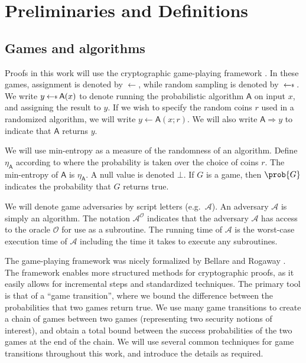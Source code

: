 \chapter{Preliminaries and Definitions} \label{sec:preliminaries}

\section{Games and algorithms}
Proofs in this work will use the cryptographic game-playing framework \cite{EC:BelRog06}. In these games, assignment is denoted by $\leftarrow$, while random sampling is denoted by $\sample$. We write $y \sample \mathsf{A}(x)$ to denote running the probabilistic algorithm $\mathsf{A}$ on input $x$, and assigning the result to $y$. If we wish to specify the random coins $r$ used in a randomized algorithm, we will write $y \leftarrow \mathsf{A}(x;r)$. We will also write $\mathsf{A} \Rightarrow y$ to indicate that $\mathsf{A}$ returns $y$.

We will use min-entropy as a measure of the randomness of an algorithm. Define $\eta_\mathsf{A}$ according to
where the probability is taken over the choice of coins $r$. The min-entropy of $\mathsf{A}$ is $\eta_\mathsf{A}$. A null value is denoted $\bot$. If $G$ is a game, then $\prob{G}$ indicates the probability that $G$ returns true. 

We will denote game adversaries by script letters (e.g.\ $\mathcal{A}$). An adversary $\mathcal{A}$ is simply an algorithm. The notation $\mathcal{A}^{\mathcal{O}}$ indicates that the adversary $\mathcal{A}$ has access to the oracle $\mathcal{O}$ for use as a subroutine. The running time of $\mathcal{A}$ is the worst-case execution time of $\mathcal{A}$ including the time it takes to execute any subroutines.

The game-playing framework was nicely formalized by Bellare and Rogaway \cite{EC:BelRog06}. The framework enables more structured methods for cryptographic proofs, as it easily allows for incremental steps and standardized techniques. The primary tool is that of a ``game transition'', where we bound the difference between the probabilities that two games return true. We use many game transitions to create a chain of games between two games (representing two security notions of interest), and obtain a total bound between the success probabilities of the two games at the end of the chain. We will use several common techniques for game transitions throughout this work, and introduce the details as required.


